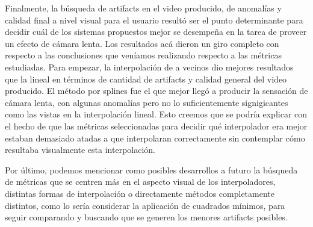 Finalmente, la búsqueda de artifacts en el video producido, de anomalías y
calidad final a nivel visual para el usuario resultó ser el punto determinante
para decidir cuál de los sistemas propuestos mejor se desempeña en la tarea de
proveer un efecto de cámara lenta. Los resultados acá dieron un giro completo
con respecto a las conclusiones que veníamos realizando respecto a las métricas
estudiadas. Para empezar, la interpolación de a vecinos dio mejores
resultados que la lineal en términos de cantidad de artifacts y calidad general
del video producido. El método por splines fue el que mejor llegó a producir la
sensación de cámara lenta, con algunas anomalías pero no lo suficientemente
signigicantes como las vistas en la interpolación lineal. Esto creemos que se
podría explicar con el hecho de que las métricas seleccionadas para decidir qué
interpolador era mejor estaban demasiado atadas a que interpolaran
correctamente sin contemplar cómo resultaba visualmente esta interpolación.

Por último, podemos mencionar como posibles desarrollos a futuro la búsqueda de
métricas que se centren más en el aspecto visual de los interpoladores,
distintas formas de interpolación o directamente métodos completamente
distintos, como lo sería considerar la aplicación de cuadrados mínimos, para
seguir comparando y buscando que se generen los menores artifacts posibles.
